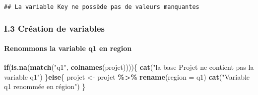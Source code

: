 \documentclass[
]{article}
\newenvironment{Shaded}{\begin{snugshade}}{\end{snugshade}}
\newcommand{\AttributeTok}[1]{\textcolor[rgb]{0.13,0.29,0.53}{#1}}
\newcommand{\ControlFlowTok}[1]{\textcolor[rgb]{0.13,0.29,0.53}{\textbf{#1}}}
\newcommand{\FunctionTok}[1]{\textcolor[rgb]{0.13,0.29,0.53}{\textbf{#1}}}
\newcommand{\NormalTok}[1]{#1}
\newcommand{\OtherTok}[1]{\textcolor[rgb]{0.56,0.35,0.01}{#1}}
\newcommand{\SpecialCharTok}[1]{\textcolor[rgb]{0.81,0.36,0.00}{\textbf{#1}}}
\newcommand{\StringTok}[1]{\textcolor[rgb]{0.31,0.60,0.02}{#1}}
\begin{document}
\begin{Shaded}
\end{Shaded}

\begin{verbatim}
## La variable Key ne possède pas de valeurs manquantes
\end{verbatim}

\hypertarget{i.3-cruxe9ation-de-variables}{%
\subsubsection{\texorpdfstring{\textbf{I.3 Création de
variables}}{I.3 Création de variables}}\label{i.3-cruxe9ation-de-variables}}

\hypertarget{renommons-la-variable-q1-en-region}{%
\paragraph{\texorpdfstring{Renommons la variable \textbf{q1} en
\textbf{region}}{Renommons la variable q1 en region}}\label{renommons-la-variable-q1-en-region}}

\begin{Shaded}
\begin{Highlighting}[]
\ControlFlowTok{if}\NormalTok{(}\FunctionTok{is.na}\NormalTok{(}\FunctionTok{match}\NormalTok{(}\StringTok{"q1"}\NormalTok{, }\FunctionTok{colnames}\NormalTok{(projet))))\{}
  \FunctionTok{cat}\NormalTok{(}\StringTok{"la base \textquotesingle{}Projet\textquotesingle{} ne contient pas la variable \textquotesingle{}q1\textquotesingle{}"}\NormalTok{)}
\NormalTok{\}}\ControlFlowTok{else}\NormalTok{\{}
\NormalTok{  projet }\OtherTok{\textless{}{-}}\NormalTok{ projet }\SpecialCharTok{\%\textgreater{}\%}
  \FunctionTok{rename}\NormalTok{(}\AttributeTok{region =}\NormalTok{ q1)}
  \FunctionTok{cat}\NormalTok{(}\StringTok{"Variable \textquotesingle{}q1\textquotesingle{} renommée en \textquotesingle{}région\textquotesingle{}"}\NormalTok{)}
\NormalTok{\}}
\end{Highlighting}
\end{Shaded}
\end{document}
